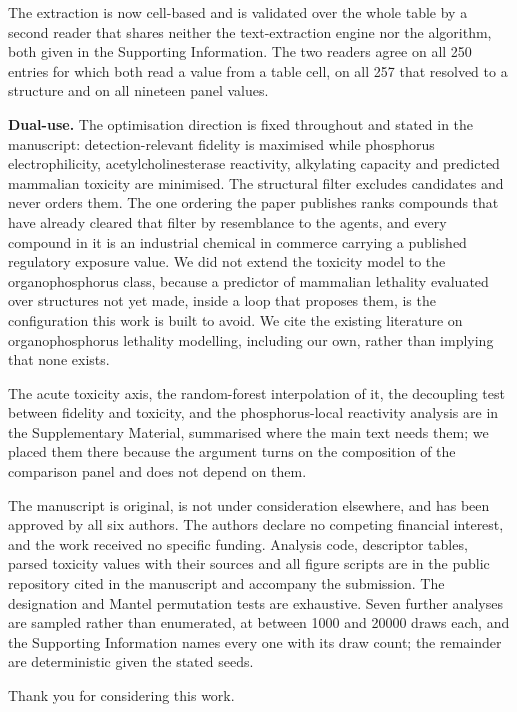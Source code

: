 \documentclass[11pt,a4paper]{article}
\begin{document}
The extraction is now cell-based and is validated over the whole table by a
second reader that shares neither the text-extraction engine nor the algorithm,
both given in the Supporting Information. The two readers agree on all 250
entries for which both read a value from a table cell, on all 257 that resolved
to a structure and on all nineteen panel values.

\textbf{Dual-use.} The optimisation direction is fixed throughout and stated in
the manuscript: detection-relevant fidelity is maximised while phosphorus
electrophilicity, acetylcholinesterase reactivity, alkylating capacity and
predicted mammalian toxicity are minimised. The structural filter excludes
candidates and never orders them. The one ordering the paper publishes ranks
compounds that have already cleared that filter by resemblance to the agents,
and every compound in it is an industrial chemical in commerce carrying a
published regulatory exposure value. We did not extend the toxicity model to the
organophosphorus class, because a predictor of mammalian lethality evaluated over
structures not yet made, inside a loop that proposes them, is the configuration
this work is built to avoid. We cite the existing literature on organophosphorus
lethality modelling, including our own, rather than implying that none exists.

The acute toxicity axis, the random-forest interpolation of it, the decoupling
test between fidelity and toxicity, and the phosphorus-local reactivity analysis
are in the Supplementary Material, summarised where the main text needs them;
we placed them there because the argument turns on the composition of the
comparison panel and does not depend on them.

The manuscript is original, is not under consideration elsewhere, and has been
approved by all six authors. The authors declare no competing financial interest,
and the work received no specific funding. Analysis code, descriptor tables,
parsed toxicity values with their sources and all figure scripts are in the
public repository cited in the manuscript and accompany the submission.
The designation and Mantel permutation tests are exhaustive. Seven further
analyses are sampled rather than enumerated, at between 1000 and 20000 draws
each, and the Supporting Information names every one with its draw count; the
remainder are deterministic given the stated seeds.

Thank you for considering this work.

\vspace{4pt}
\end{document}

